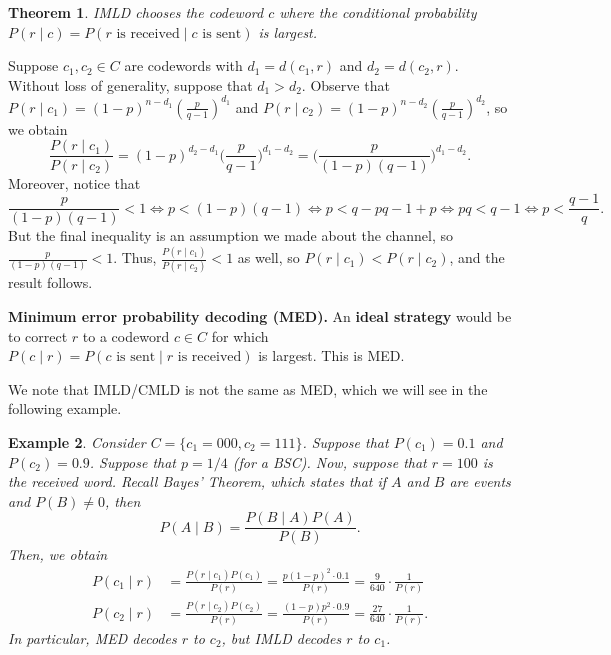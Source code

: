 \documentclass[10pt]{article}
\makeatletter
\theoremstyle{newstyle}
\newtheorem{thm}{Theorem}[subsection]
\newtheorem{exmp}[thm]{Example}
\newenvironment{pf}[1][\proofname]{\par
  \pushQED{\qed}%
  \normalfont \topsep0\p@\relax
  \trivlist
  \item[\hskip\labelsep\scshape
  #1\@addpunct{.}]\ignorespaces
}{%
  \popQED\endtrivlist\@endpefalse
}
\makeatother
\begin{document}
\begin{thm}
IMLD chooses the codeword $c$ where the conditional probability 
$P(r \mid c) = P(r \text{ is received} \mid c \text{ is sent})$
is largest.
\end{thm}
\begin{pf}
Suppose $c_1, c_2 \in C$ are codewords with $d_1 = d(c_1, r)$ and $d_2 = d(c_2, r)$. 
Without loss of generality, suppose that $d_1 > d_2$. Observe that 
$P(r \mid c_1) = (1-p)^{n-d_1}(\frac{p}{q-1})^{d_1}$ and 
$P(r \mid c_2) = (1-p)^{n-d_2}(\frac{p}{q-1})^{d_2}$, so we obtain
\[ \frac{P(r \mid c_1)}{P(r \mid c_2)} = (1-p)^{d_2-d_1} \Big( \frac{p}{q-1} \Big)^{d_1-d_2} 
= \Big( \frac{p}{(1-p)(q-1)} \Big)^{d_1-d_2}. \]
Moreover, notice that 
\[ \frac{p}{(1-p)(q-1)} < 1 \iff p < (1-p)(q-1) \iff p < q-pq-1+p \iff pq < q-1 
\iff p < \frac{q-1}q. \]
But the final inequality is an assumption we made about the channel,
so $\frac{p}{(1-p)(q-1)} < 1$. Thus, $\frac{P(r \mid c_1)}{P(r \mid c_2)} < 1$ 
as well, so $P(r \mid c_1) < P(r \mid c_2)$, and the result follows.
\end{pf}

{\bf Minimum error probability decoding (MED).} An {\bf ideal strategy} would be to correct 
$r$ to a codeword $c \in C$ for which $P(c \mid r) = P(c \text{ is sent} \mid 
r \text{ is received})$ is largest. This is MED.

We note that IMLD/CMLD is not the same as MED, which we will see in the following example.

\begin{exmp}
Consider $C = \{c_1 = 000, c_2 = 111\}$. Suppose that $P(c_1) = 0.1$ and 
$P(c_2) = 0.9$. Suppose that $p = 1/4$ (for a BSC). Now, suppose that $r = 100$ is the received 
word. Recall Bayes' Theorem, which states that if $A$ and $B$ are events and $P(B) \neq 0$, then 
\[ P(A \mid B) = \frac{P(B \mid A) P(A)}{P(B)}. \]
Then, we obtain 
\begin{align*}
P(c_1 \mid r) &= \frac{P(r \mid c_1) P(c_1)}{P(r)} = \frac{p(1-p)^2 \cdot 0.1}{P(r)} = 
\frac9{640} \cdot \frac{1}{P(r)} \\ 
P(c_2 \mid r) &= \frac{P(r \mid c_2) P(c_2)}{P(r)} = \frac{(1-p)p^2 \cdot 0.9}{P(r)} = 
\frac{27}{640} \cdot \frac{1}{P(r)}.
\end{align*}
In particular, MED decodes $r$ to $c_2$, but IMLD decodes $r$ to $c_1$.
\end{exmp}
\end{document}
